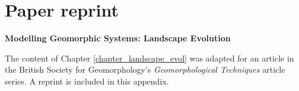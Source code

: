 %
%
%
%
\chapter{Paper reprint}
\label{appendix_paper}

\textbf{Modelling Geomorphic Systems: Landscape Evolution}

\noindent
The content of Chapter \ref{chapter_landscape_evol} was adapted for an article in the British Society for Geomorphology's \textit{Geomorphological Techniques} article series. A reprint is included in this appendix.



